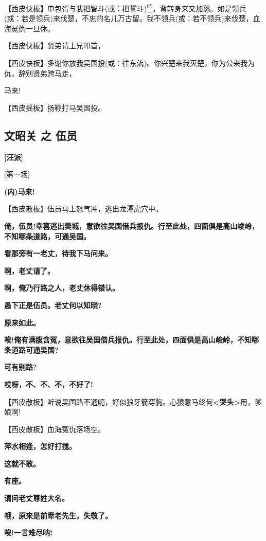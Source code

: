 \textbf{【}西皮快板\textbf{】}申包胥与我把智斗(或：把誓斗)\protect\hyperlink{fn65}{\textsuperscript{65}}，背转身来又加愁。如是领兵(或：若是领兵)来伐楚，不忠的名儿万古留。我不领兵(或：若不领兵)来伐楚，血海冤仇一旦休。

\textbf{【}西皮快板\textbf{】}贤弟请上兄叩首，

\textbf{【}西皮快板\textbf{】}多谢你放我吴国投(或：往东流)。你兴楚来我灭楚，你为公来我为仇。辞别贤弟跨马走，

马来!

【西皮摇板】扬鞭打马吴国投。

\hypertarget{ux6587ux662dux5173-ux4e4b-ux4f0dux5458}{%
\subsection{文昭关 之
伍员}\label{ux6587ux662dux5173-ux4e4b-ux4f0dux5458}}

\textbf{{[}汪派{]}}

{[}第一场{]}

\textbf{(内)马来!}

\textbf{【}西皮散板】伍员马上怒气冲，逃出龙潭虎穴中。

\textbf{俺，伍员!幸喜逃出樊城，意欲往吴国借兵报仇。行至此处，四面俱是高山峻岭，不知哪条道路，可通吴国。}

\textbf{看那旁有一老丈，待我下马问来。}

\textbf{啊，老丈请了。}

\textbf{啊，俺乃行路之人，老丈休得错认。}

\textbf{愚下正是伍员。老丈何以知晓?}

\textbf{原来如此。}

\textbf{唉!俺有满腹含冤，意欲往吴国借兵报仇。行至此处，四面俱是高山峻岭，不知哪条道路可通吴国?}

\textbf{可有别路?}

\textbf{哎呀，不、不、不，不好了!}

\textbf{【}西皮散板】听说吴国路不通呃，好似狼牙箭穿胸。心猿意马终何\textbf{\textless{}哭头\textgreater{}}用，爹娘啊!

\textbf{【}西皮散板】血海冤仇落场空。

\textbf{萍水相逢，怎好打搅。}

\textbf{这就不敢。}

\textbf{有座。}

\textbf{请问老丈尊姓大名。}

\textbf{哦，原来是前辈老先生，失敬了。}

\textbf{唉!一言难尽呐!}

